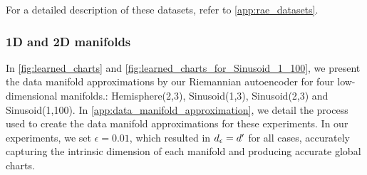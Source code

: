     \noindent For a detailed description of these datasets, refer to \ref{app:rae_datasets}.

    \subsubsection{1D and 2D manifolds}
    In \ref{fig:learned_charts} and \ref{fig:learned_charts_for_Sinusoid_1_100}, we present the data manifold approximations by our Riemannian autoencoder for four low-dimensional manifolds.: Hemisphere(2,3), Sinusoid(1,3), Sinusoid(2,3) and Sinusoid(1,100). In \ref{app:data_manifold_approximation}, we detail the process used to create the data manifold approximations for these experiments. In our experiments, we set \( \epsilon = 0.01 \), which resulted in \( d_{\epsilon} = d' \) for all cases, accurately capturing the intrinsic dimension of each manifold and producing accurate global charts.

